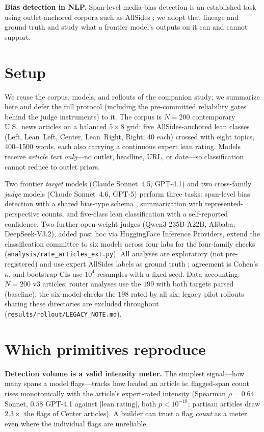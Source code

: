 \documentclass{article}
\newcommand{\kap}{\kappa}
\begin{document}
\textbf{Bias detection in NLP.} Span-level media-bias detection is an
established task \citep{spinde2021babe,hamborg2019automated} using
outlet-anchored corpora such as AllSides \citep{baly2020detect}; we adopt
that lineage and ground truth and study what a frontier model's outputs
on it can and cannot support.

\section{Setup}
\label{sec:setup}
We reuse the corpus, models, and rollouts of the companion study; we
summarize here and defer the full protocol (including the pre-committed
reliability gates behind the judge instruments) to it. The corpus is
$N{=}200$ contemporary U.S.\ news articles on a balanced $5\times8$
grid: five AllSides-anchored lean classes (Left, Lean~Left, Center,
Lean~Right, Right; 40 each) crossed with eight topics, 400--1500 words,
each also carrying a continuous expert lean rating. Models receive
\emph{article text only}---no outlet, headline, URL, or date---so
classification cannot reduce to outlet priors.

Two frontier \emph{target} models (Claude Sonnet~4.5, GPT-4.1) and two
cross-family \emph{judge} models (Claude Sonnet~4.6, GPT-5) perform three
tasks: span-level bias detection with a shared bias-type schema
\citep{spinde2021babe,hamborg2019automated}, summarization with
represented-perspective counts, and five-class lean classification with a
self-reported confidence. Two further open-weight judges
(Qwen3-235B-A22B, Alibaba; DeepSeek-V3.2), added post hoc via
HuggingFace Inference Providers, extend the classification committee to
six models across four labs for the four-family checks
(\texttt{analysis/rate\_articles\_ext.py}). All analyses are exploratory
(not pre-registered) and use expert AllSides labels as ground truth
\citep{baly2020detect}; agreement is Cohen's $\kap$, and bootstrap CIs
use $10^4$ resamples with a fixed seed. Data accounting: $N{=}200$ v3 articles; router
analyses use the $199$ with both targets parsed (baseline); the
six-model checks the $198$ rated by all six; legacy pilot rollouts
sharing these directories are excluded throughout
(\texttt{results/rollout/LEGACY\_NOTE.md}).

\section{Which primitives reproduce}
\label{sec:map}

\textbf{Detection volume is a valid intensity meter.} The simplest
signal---how many spans a model flags---tracks how loaded an article is:
flagged-span count rises monotonically with the article's expert-rated
intensity (Spearman $\rho{=}0.64$ Sonnet, $0.58$ GPT-4.1 against
$|\text{lean rating}|$, both $p{<}10^{-18}$; partisan articles draw
$2.3\times$ the flags of Center articles). A builder can trust a flag
\emph{count} as a meter even where the individual flags are unreliable.
\end{document}
